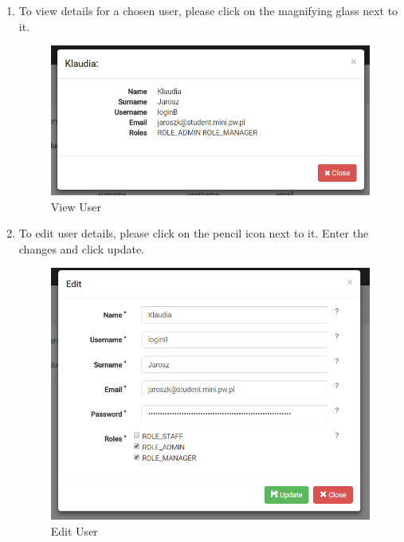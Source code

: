 \documentclass[a4paper,11pt,twoside]{report}
\theoremstyle{definition}
\begin{document}
\begin{enumerate}
\item To view details for a chosen user, please click on the magnifying glass next to it.


\begin{figure}[h!]
\begin{center}
\includegraphics[width=\textwidth]{AS/users/3}
\end{center}
\caption{View User}
\end{figure}
\thispagestyle{empty}
\item To edit user details, please click on the pencil icon next to it. Enter the changes and click update. 


\begin{figure}[h!]
\begin{center}
\includegraphics[width=\textwidth]{AS/users/4}
\end{center}
\caption{Edit User}
\end{figure}
\thispagestyle{empty}


\end{enumerate}
\end{document}
